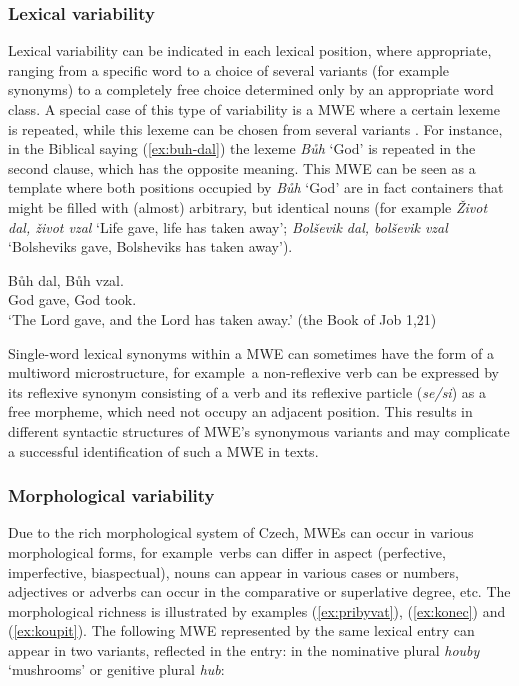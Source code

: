 \documentclass[output=paper,colorlinks,citecolor=brown]{langscibook}
\begin{document}
\subsubsection{Lexical variability}
\label{variability-lex}
Lexical variability can be indicated in each lexical position, where appropriate, ranging from a specific word to a choice of several variants (for example synonyms) to a completely free choice determined only by an appropriate word class. A special case of this type of variability is a MWE where a certain lexeme is repeated, while this lexeme can be chosen from several variants \citep{Jelinek:2020}.
For instance, in the Biblical saying (\ref{ex:buh-dal}) 
the lexeme \emph{Bůh}  ‘God’ is repeated in the second clause, which has the opposite meaning. This MWE can be seen as a template where both positions occupied by \emph{Bůh} ‘God’ are in fact containers that might be filled with (almost) arbitrary, but identical nouns
(for example \emph{Život dal, život vzal} ‘Life gave, life has taken away’; \emph{Bolševik dal, bolševik vzal} ‘Bolsheviks gave, Bolsheviks has taken away’).

\ea\label{ex:buh-dal}
\gll 
  Bůh dal, Bůh vzal.\\
  God gave, God took.\\
\glt 
`The Lord gave, and the Lord has taken away.'  \hfill (the Book of Job 1,21) %
\z

\noindent
Single-word lexical synonyms within a MWE can sometimes have the form of a multiword microstructure, for example\ a non-reflexive verb can be expressed by its reflexive synonym consisting of a verb and its reflexive particle (\emph{se/si}) as a free morpheme, which need not occupy an adjacent position. This results in different syntactic structures of MWE's synonymous variants and may complicate a successful identification of such a MWE in texts.


\subsubsection{Morphological variability}
\label{variability-morph}
Due to the rich morphological
system of Czech, MWEs can occur in various morphological
forms, for example\ verbs can differ in aspect (perfective, imperfective, biaspectual), nouns can appear in various cases or numbers, adjectives or adverbs can occur in the comparative or superlative degree, etc. The morphological richness is illustrated by examples (\ref{ex:pribyvat}), (\ref{ex:konec}) and (\ref{ex:koupit}). The following MWE represented by the same lexical entry 
can appear in two variants, reflected in the entry: in the nominative plural \emph{houby} ‘mushrooms’ or genitive plural \emph{hub}:
\end{document}
